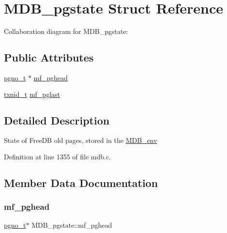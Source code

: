 \hypertarget{struct_m_d_b__pgstate}{}\section{M\+D\+B\+\_\+pgstate Struct Reference}
\label{struct_m_d_b__pgstate}


Collaboration diagram for M\+D\+B\+\_\+pgstate\+:
\subsection*{Public Attributes}
\begin{DoxyCompactItemize}
\item 
\mbox{\hyperlink{group__internal_gadb65f0424c9d3827bf6409087ad555cd}{pgno\+\_\+t}} $\ast$ \mbox{\hyperlink{struct_m_d_b__pgstate_a87885b2e082589287b381554cb8f7e7a}{mf\+\_\+pghead}}
\item 
\mbox{\hyperlink{group__internal_gabbaef7c9c710f8652a62c32d748c040e}{txnid\+\_\+t}} \mbox{\hyperlink{struct_m_d_b__pgstate_a4a9a958ac39b45693ca27140bd4f63de}{mf\+\_\+pglast}}
\end{DoxyCompactItemize}


\subsection{Detailed Description}
State of Free\+DB old pages, stored in the \mbox{\hyperlink{struct_m_d_b__env}{M\+D\+B\+\_\+env}} 

Definition at line 1355 of file mdb.\+c.



\subsection{Member Data Documentation}
\mbox{\label{struct_m_d_b__pgstate_a87885b2e082589287b381554cb8f7e7a}} 
\subsubsection{\texorpdfstring{mf\+\_\+pghead}{mf\_pghead}}
{\footnotesize\ttfamily \mbox{\hyperlink{group__internal_gadb65f0424c9d3827bf6409087ad555cd}{pgno\+\_\+t}}$\ast$ M\+D\+B\+\_\+pgstate\+::mf\+\_\+pghead}

